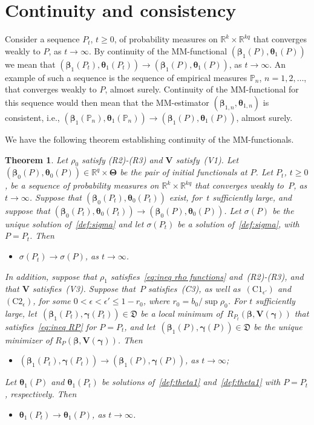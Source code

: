 \documentclass{article}
\numberwithin{equation}{section}
\theoremstyle{plain}
\newtheorem{theorem}{Theorem}
\newcommand{\R}{\mathbb{R}}
\newcommand{\bbeta}{\bm\beta}
\newcommand{\btheta}{\bm\theta}
\newcommand{\bgamma}{\bm\gamma}
\newcommand{\bTheta}{\bm\Theta}
\newcommand{\bV}{\mathbf{V}}
\begin{document}
\section{Continuity and consistency}
\label{sec:continuity}
Consider a sequence $P_t$, $t\geq0$, of probability measures on $\R^k\times\R^{kq}$ that converges weakly to $P$, as $t\to\infty$.
By continuity of the MM-functional $(\bbeta_1(P),\btheta_1(P))$ we mean that 
$(\bbeta_1(P_t),\btheta_1(P_t))\to(\bbeta_1(P),\btheta_1(P))$, as $t\to\infty$.
An example of such a sequence is the sequence of empirical measures $\mathbb{P}_n$, $n=1,2,\ldots$, that converges weakly to $P$, almost surely.
Continuity of the MM-functional for this sequence would then mean that the MM-estimator 
$(\bbeta_{1,n},\btheta_{1,n})$ is consistent,
i.e., $(\bbeta_1(\mathbb{P}_n),\btheta_1(\mathbb{P}_n))\to(\bbeta_1(P),\btheta_1(P))$,
almost surely.

We have the following theorem establishing continuity of the MM-functionals.
\begin{theorem}
\label{th:continuity}
Let $\rho_0$ satisfy (R2)-(R3) and $\bV$ satisfy~(V1).
Let $(\bbeta_0(P),\btheta_0(P))\in\R^{q}\times\bTheta$ be the pair of initial functionals at $P$.
Let $P_t$, $t\geq0$, be a sequence of probability measures on $\R^k\times \R^{kq}$ that converges weakly to~$P$, as $t\to\infty$.
Suppose that $(\bbeta_0(P_t),\btheta_0(P_t))$ exist, for~$t$ sufficiently large, 
and suppose that $(\bbeta_0(P_t),\btheta_0(P_t))\to(\bbeta_0(P),\btheta_0(P))$.
Let $\sigma(P)$ be the unique solution of~\eqref{def:sigma}
and let $\sigma(P_t)$ be a solution of~\eqref{def:sigma}, with~$P=P_t$.
Then
\begin{itemize}
\item[(i)]
$\sigma(P_t)\to\sigma(P)$, as $t\to\infty$.
\end{itemize}
In addition, suppose that $\rho_1$ satisfies~\eqref{eq:ineq rho functions}
and~(R2)-(R3),
and that $\bV$ satisfies~(V3).
Suppose that~$P$ satisfies~(C3), as well as~$(\text{C1}_{\epsilon'})$ and $(\text{C2}_\epsilon)$,
for some $0<\epsilon<\epsilon'\leq 1-r_0$,
where $r_0=b_0/\sup\rho_0$.
For $t$ sufficiently large, 
let~$(\bbeta_1(P_t),\bgamma(P_t))\in \mathfrak{D}$ 
be a local minimum of~$R_{P_t}(\bbeta,\bV(\bgamma))$ that satisfies~\eqref{eq:ineq RP} for $P=P_t$,
and let~$(\bbeta_1(P),\bgamma(P))\in \mathfrak{D}$ be the unique minimizer of $R_P(\bbeta,\bV(\bgamma))$.
Then
\begin{itemize}
\item[(ii)]
$(\bbeta_1(P_t),\bgamma(P_t))\to(\bbeta_1(P),\bgamma(P))$, as $t\to\infty$;
\end{itemize}
Let $\btheta_1(P)$ and $\btheta_1(P_t)$ be solutions of~\eqref{def:theta1}
and~\eqref{def:theta1} with $P=P_t$, respectively.
Then
\begin{itemize}
\item[(iii)]
$\btheta_1(P_t)\to \btheta_1(P)$, as $t\to\infty$.
\end{itemize}
\end{theorem}
\end{document}
